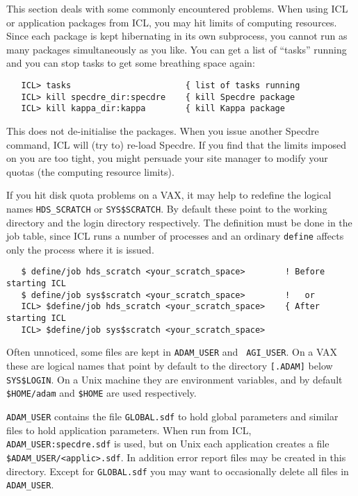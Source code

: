 This section deals with some commonly encountered problems. When using ICL or
application packages from ICL, you may hit limits of computing resources. Since
each package is kept hibernating in its own subprocess, you cannot run as many
packages simultaneously as you like. You can get a list of ``tasks'' running
and you can stop tasks to get some breathing space again:

\begin{verbatim}
   ICL> tasks                       { list of tasks running
   ICL> kill specdre_dir:specdre    { kill Specdre package
   ICL> kill kappa_dir:kappa        { kill Kappa package
\end{verbatim}

This does not de-initialise the packages. When you issue another Specdre
command, ICL will (try to) re-load Specdre. If you find that the limits imposed
on you are too tight, you might persuade your site manager to modify your
quotas (the computing resource limits).

If you hit disk quota problems on a VAX, it may help to redefine the logical
names {\tt HDS\_SCRATCH} or {\tt SYS\$SCRATCH}. By default these point to the
working directory and the login directory respectively. The definition must be
done in the job table, since ICL runs a number of processes and an ordinary
{\tt define} affects only the process where it is issued.

\begin{verbatim}
   $ define/job hds_scratch <your_scratch_space>        ! Before starting ICL
   $ define/job sys$scratch <your_scratch_space>        !   or
   ICL> $define/job hds_scratch <your_scratch_space>    { After starting ICL
   ICL> $define/job sys$scratch <your_scratch_space>
\end{verbatim}

Often unnoticed, some files are kept in {\tt ADAM\_USER} and {\tt
AGI\_USER}. On a VAX these are logical names that point by default to
the directory {\tt [.ADAM]} below {\tt SYS\$LOGIN}. On a Unix machine
they are environment variables, and by default {\tt \$HOME/adam} and
{\tt \$HOME} are used respectively.

{\tt ADAM\_USER} contains the file {\tt GLOBAL.sdf} to hold global parameters
and similar files to hold application parameters. When run from ICL, {\tt
ADAM\_USER:specdre.sdf} is used, but on Unix each application creates a file
{\tt \$ADAM\_USER/<applic>.sdf}. In addition error report files may be created
in this directory. Except for {\tt GLOBAL.sdf} you may want to occasionally
delete all files in {\tt ADAM\_USER}.

